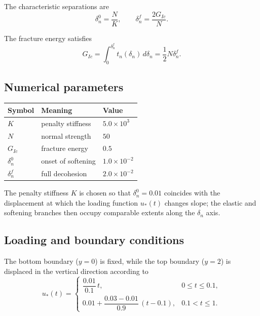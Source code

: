 The characteristic separations are
\begin{equation}
\delta_n^0 = \frac{N}{K},
\qquad
\delta_n^f = \frac{2 G_{Ic}}{N}.
\end{equation}

The fracture energy satisfies
\begin{equation}
G_{Ic} = \int_0^{\delta_n^f} t_n(\delta_n)\, d\delta_n
= \frac{1}{2} N \delta_n^f.
\end{equation}

\subsection{Numerical parameters}

\begin{table}[h]
\centering
\small
\begin{tabular}{lll}
\toprule
Symbol & Meaning & Value \\
\midrule
$K$ & penalty stiffness & $5.0 \times 10^{3}$ \\
$N$ & normal strength & $50$ \\
$G_{Ic}$ & fracture energy & $0.5$ \\
$\delta_n^0$ & onset of softening & $1.0 \times 10^{-2}$ \\
$\delta_n^f$ & full decohesion & $2.0 \times 10^{-2}$ \\
\bottomrule
\end{tabular}
\end{table}

The penalty stiffness $K$ is chosen so that $\delta_n^0 = 0.01$ coincides
with the displacement at which the loading function $u_*(t)$ changes slope;
the elastic and softening branches then occupy comparable extents along
the $\delta_n$ axis.

\subsection{Loading and boundary conditions}

The bottom boundary ($y=0$) is fixed, while the top boundary ($y=2$) is
displaced in the vertical direction according to
\begin{equation}
u_*(t) =
\begin{cases}
\dfrac{0.01}{0.1}\, t, & 0 \le t \le 0.1, \\[8pt]
0.01
+ \dfrac{0.03 - 0.01}{0.9}\,(t - 0.1),
& 0.1 < t \le 1.
\end{cases}
\end{equation}


